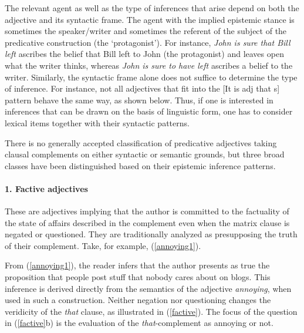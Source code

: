 \documentclass[10pt]{article}
\begin{document}
The relevant agent as well as the type of inferences that arise depend
on both the adjective and its syntactic frame.  The agent with the
implied epistemic stance is sometimes the speaker/writer and sometimes
the referent of the subject of the predicative construction (the
`protagonist').  For instance, \textit{John is sure that Bill left}
ascribes the belief that Bill left to John (the protagonist) and
leaves open what the writer thinks, whereas \textit{John is sure to have
left} ascribes a belief to the writer. Similarly, the syntactic frame
alone does not suffice to determine the type of inference. For
instance, not all adjectives that fit into the [It is {\sc adj} that
  {\sc s}] pattern behave the same way, as shown below.  Thus, if one
is interested in inferences that can be drawn on the basis of
linguistic form, one has to consider lexical items together with their
syntactic patterns.

There is no generally accepted classification of predicative adjectives taking clausal complements on either syntactic or semantic grounds, but three broad classes have been distinguished based on their epistemic inference patterns. 

\vspace{-1.0em}
\paragraph{1. Factive adjectives} These are adjectives  implying that the author is committed to the factuality of the state of affairs described in the complement even when the matrix clause is negated or questioned. They are traditionally analyzed as presupposing the truth of their complement.
Take, for example, (\ref{annoying1}).
 \vspace{-0.5em}
\vspace{-0.5em}
 
 
\noindent From (\ref{annoying1}), the reader infers that the author 
presents 
as true the proposition 
that people post stuff that nobody cares about on blogs.
This inference is derived directly from the semantics of the adjective {\it annoying}, when used in such a construction. 
Neither negation nor questioning  changes the veridicity of the \emph{that }clause, as illustrated in (\ref{factive}).  The focus of the question in (\ref{factive}b) is the evaluation of the \textit{that}-complement as annoying or not.
 \vspace{-0.5em}
 \vspace{-0.5em}
\end{document}
